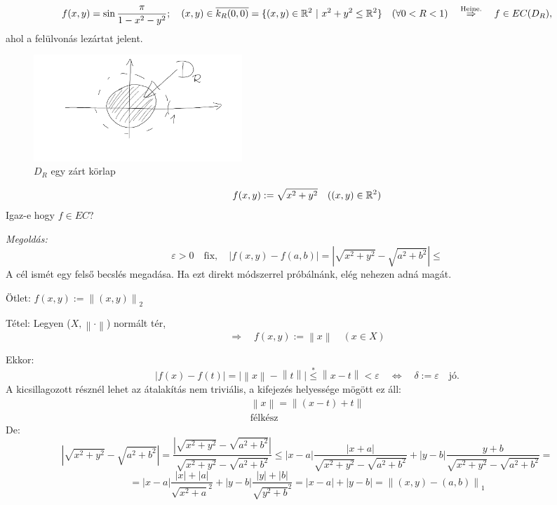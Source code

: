 \documentclass[a4paper,11.5pt]{article}
\newcommand{\norm}[1]{\left\lVert#1\right\rVert}
\begin{document}
	\begin{note}
		\[ f(x,y)=\sin\frac{\pi}{1-x^2-y^2};\quad (x,y)\in\overline{k_R(0,0)}=\{ (x,y)\in\mathbb{R}^2\ | \ x^2+y^2\leq \mathbb{R}^2 \}\quad (\forall 0<R<1)\quad \overset{\text{Heine.}}{\Rightarrow}\quad f\in EC(D_R), \]
		ahol a felülvonás lezártat jelent.
		\begin{figure}[H]
			\centering
			\includegraphics[height=4cm]{../2zh/kepek/55.png}
			\caption{$D_R$ egy zárt körlap}
		\end{figure}
	\end{note}
	\begin{task}
		\[ f(x,y):=\sqrt{x^2+y^2}\quad ((x,y)\in\mathbb{R}^2) \]
		Igaz-e hogy $f\in EC$?
		
		\textit{Megoldás:} 
		\[ \varepsilon>0\quad \text{fix},\quad |f(x,y)-f(a,b)|=|\sqrt{x^2+y^2}-\sqrt{a^2+b^2}|\leq \]
		A cél ismét egy felső becslés megadása. Ha ezt direkt módszerrel próbálnánk, elég nehezen adná magát.
		
		Ötlet: $f(x,y):=\norm{(x,y)}_2$
		
		Tétel: Legyen ($X,\norm{\cdot}$) normált tér,
		\[ \Rightarrow\quad f(x,y):=\norm{x}\quad (x\in X) \]
		
		Ekkor:
		\[ |f(x)-f(t)|=\big|\norm{x}-\norm{t}\big|\overset{*}{\leq}\norm{x-t}<\varepsilon\quad \Leftrightarrow\quad \delta:=\varepsilon\quad \text{jó.} \]
		A kicsillagozott résznél lehet az átalakítás nem triviális, a kifejezés helyessége mögött ez áll:
		\begin{align}
			\norm{x}=\norm{(x-t)+t}\\
			\text{félkész}
		\end{align}
		De:
		\[ \left|\sqrt{x^2+y^2}-\sqrt{a^2+b^2}\right|=\frac{\left|\sqrt{x^2+y^2}-\sqrt{a^2+b^2}\right|}{\sqrt{x^2+y^2}-\sqrt{a^2+b^2}}\leq|x-a|\frac{|x+a|}{\sqrt{x^2+y^2}-\sqrt{a^2+b^2}}+|y-b|\frac{y+b}{\sqrt{x^2+y^2}-\sqrt{a^2+b^2}}= \]
		\[ = |x-a|\frac{|x|+|a|}{\sqrt{x^2 + a}^2}+|y-b|\frac{|y|+|b|}{\sqrt{y^2+b}^2}=|x-a|+|y-b|=\norm{(x,y)-(a,b)}_1 \] 
	\end{task}
\end{document}
